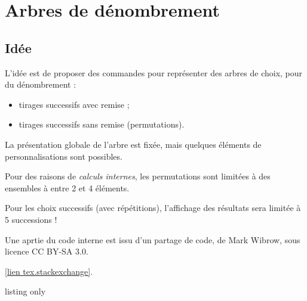 \newpage

\section{Arbres de dénombrement}\label{arbdenomb}

\subsection{Idée}

\begin{tipblock}
 L'idée est de proposer des commandes pour représenter des arbres de choix, pour du dénombrement :

\begin{itemize}
	\item tirages successifs avec remise ;
	\item tirages successifs sans remise (permutations).
\end{itemize}

La présentation globale de l'arbre est fixée, mais quelques éléments de personnalisations sont possibles.
\end{tipblock}

\begin{warningblock}
Pour des raisons de \textit{calculs internes}, les permutations sont limitées à des ensembles à entre 2 et 4 éléments.

Pour les choix successifs (avec répétitions), l'affichage des résultats sera limitée à 5 successions !
\end{warningblock}

\begin{cautionblock}
Une aprtie du code interne est issu d'un partage de code, de Mark Wibrow, sous licence CC BY-SA 3.0.

\href{https://tex.stackexchange.com/posts/174135/timeline#history_00670c25-4422-4921-b929-ac3a40009742}{[lien tex.stackexchange]}.
\end{cautionblock}

\begin{PresCodeTexPL}{listing only}

\end{PresCodeTexPL}

\begin{PresCodePL}{}
\end{PresCodePL}

